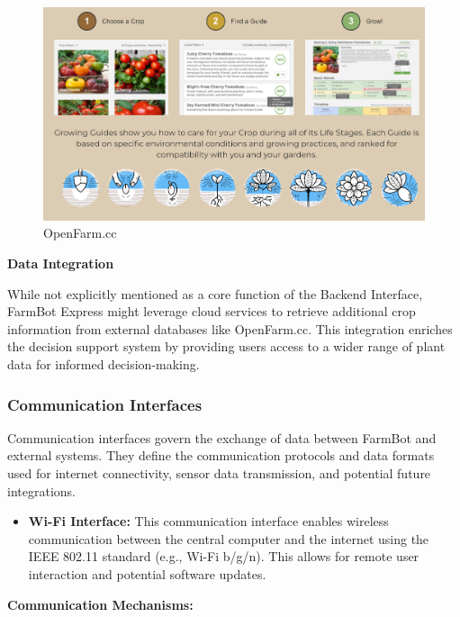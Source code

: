 \begin{itemize}
    \begin{figure}[H]
        \centering
        \includegraphics[width=0.85\linewidth]{Figures/openfarm_cc.png}
        \caption{OpenFarm.cc}
        \label{fig:openfarm}
    \end{figure}
    
    \textbf{Data Integration}
    
    While not explicitly mentioned as a core function of the Backend Interface, FarmBot Express might leverage cloud services to retrieve additional crop information from external databases like OpenFarm.cc. This integration enriches the decision support system by providing users access to a wider range of plant data for informed decision-making.
    
\end{itemize}


\subsubsection{Communication Interfaces}
Communication interfaces govern the exchange of data between FarmBot and external systems. They define the communication protocols and data formats used for internet connectivity, sensor data transmission, and potential future integrations. 
\begin{itemize}
    \item \textbf{Wi-Fi Interface:} This communication interface enables wireless communication between the central computer and the internet using the IEEE 802.11 standard (e.g., Wi-Fi b/g/n). This allows for remote user interaction and potential software updates.
\end{itemize}

\textbf{Communication Mechanisms:}

